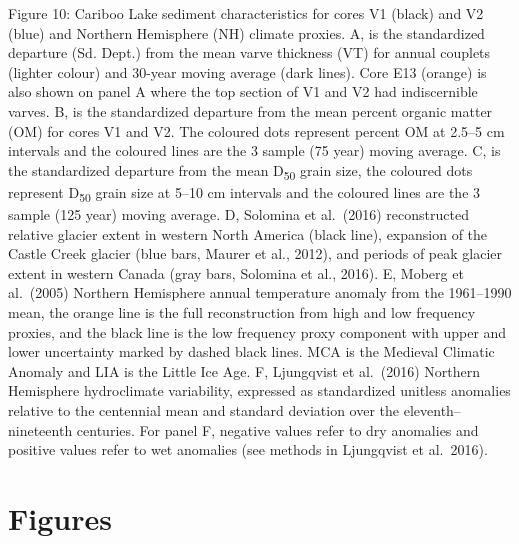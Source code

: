 \documentclass[
  letterpaper,
  DIV=11,
  numbers=noendperiod]{scrartcl}
\begin{document}
Figure 10: Cariboo Lake sediment characteristics for cores V1 (black)
and V2 (blue) and Northern Hemisphere (NH) climate proxies. A, is the
standardized departure (Sd. Dept.) from the mean varve thickness (VT)
for annual couplets (lighter colour) and 30-year moving average (dark
lines). Core E13 (orange) is also shown on panel A where the top section
of V1 and V2 had indiscernible varves. B, is the standardized departure
from the mean percent organic matter (OM) for cores V1 and V2. The
coloured dots represent percent OM at 2.5--5 cm intervals and the
coloured lines are the 3 sample (75 year) moving average. C, is the
standardized departure from the mean D\textsubscript{50} grain size, the
coloured dots represent D\textsubscript{50} grain size at 5--10 cm
intervals and the coloured lines are the 3 sample (125 year) moving
average. D, Solomina et al.~(2016) reconstructed relative glacier extent
in western North America (black line), expansion of the Castle Creek
glacier (blue bars, Maurer et al., 2012), and periods of peak glacier
extent in western Canada (gray bars, Solomina et al., 2016). E, Moberg
et al.~(2005) Northern Hemisphere annual temperature anomaly from the
1961--1990 mean, the orange line is the full reconstruction from high
and low frequency proxies, and the black line is the low frequency proxy
component with upper and lower uncertainty marked by dashed black lines.
MCA is the Medieval Climatic Anomaly and LIA is the Little Ice Age. F,
Ljungqvist et al.~(2016) Northern Hemisphere hydroclimate variability,
expressed as standardized unitless anomalies relative to the centennial
mean and standard deviation over the eleventh--nineteenth centuries. For
panel F, negative values refer to dry anomalies and positive values
refer to wet anomalies (see methods in Ljungqvist et
al.~2016).\pagebreak

\section{Figures}\label{figures}
\end{document}
